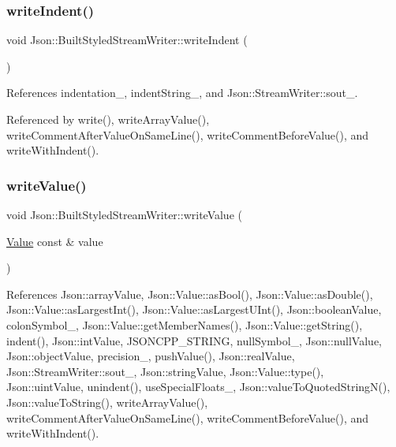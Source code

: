 \subsubsection{\texorpdfstring{write\+Indent()}{writeIndent()}}
{\footnotesize\ttfamily void Json\+::\+Built\+Styled\+Stream\+Writer\+::write\+Indent (\begin{DoxyParamCaption}{ }\end{DoxyParamCaption})\hspace{0.3cm}{\ttfamily [private]}}



References indentation\+\_\+, indent\+String\+\_\+, and Json\+::\+Stream\+Writer\+::sout\+\_\+.



Referenced by write(), write\+Array\+Value(), write\+Comment\+After\+Value\+On\+Same\+Line(), write\+Comment\+Before\+Value(), and write\+With\+Indent().

\mbox{\label{structJson_1_1BuiltStyledStreamWriter_a7c9da861861e570a51b45f270c9ff150_a7c9da861861e570a51b45f270c9ff150}} 
\subsubsection{\texorpdfstring{write\+Value()}{writeValue()}}
{\footnotesize\ttfamily void Json\+::\+Built\+Styled\+Stream\+Writer\+::write\+Value (\begin{DoxyParamCaption}\item[{\hyperlink{classJson_1_1Value}{Value} const \&}]{value }\end{DoxyParamCaption})\hspace{0.3cm}{\ttfamily [private]}}



References Json\+::array\+Value, Json\+::\+Value\+::as\+Bool(), Json\+::\+Value\+::as\+Double(), Json\+::\+Value\+::as\+Largest\+Int(), Json\+::\+Value\+::as\+Largest\+U\+Int(), Json\+::boolean\+Value, colon\+Symbol\+\_\+, Json\+::\+Value\+::get\+Member\+Names(), Json\+::\+Value\+::get\+String(), indent(), Json\+::int\+Value, J\+S\+O\+N\+C\+P\+P\+\_\+\+S\+T\+R\+I\+NG, null\+Symbol\+\_\+, Json\+::null\+Value, Json\+::object\+Value, precision\+\_\+, push\+Value(), Json\+::real\+Value, Json\+::\+Stream\+Writer\+::sout\+\_\+, Json\+::string\+Value, Json\+::\+Value\+::type(), Json\+::uint\+Value, unindent(), use\+Special\+Floats\+\_\+, Json\+::value\+To\+Quoted\+String\+N(), Json\+::value\+To\+String(), write\+Array\+Value(), write\+Comment\+After\+Value\+On\+Same\+Line(), write\+Comment\+Before\+Value(), and write\+With\+Indent().



